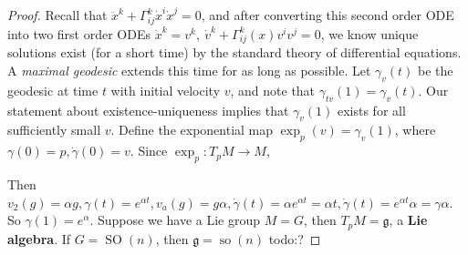 \begin{proof}
    Recall that $\ddot x^k+\Gamma _{ij}^k \dot x^i \dot x^j =0$, and after converting this second order ODE into two first order ODEs $\dot x^k=v^k,\ \dot v^k+\Gamma _{ij}^k(x)v^i v^j =0$, we know unique solutions exist (for a short time) by the standard theory of differential equations. A \emph{maximal geodesic} extends this time for as long as possible. Let $\gamma _v(t)$ be the geodesic at time $t$ with initial velocity $v$, and note that $\gamma _{tv}(1)=\gamma _v(t)$. Our statement about existence-uniqueness implies that $\gamma _v(1)$ exists for all sufficiently small $v$. Define the exponential map $\exp_p(v)=\gamma _v(1)$, where $\gamma (0)=p,\dot \gamma (0)=v$. Since $\exp _p \colon T_p M \to M$,

    Then $v_2(g)=\alpha g, \gamma (t)=e^{\alpha t}, v_a(g)=g\alpha ,\dot \gamma (t)=\alpha e^{\alpha t}=\alpha t,\dot \gamma (t)=e^{\alpha t}\alpha =\gamma \alpha $. So $\gamma (1)=e^{\alpha}$.
    Suppose we have a Lie group $M=G$, then $T_p M= \mathfrak g$, a \textbf{Lie algebra}. If $G= \operatorname{SO}(n)$, then $\mathfrak g=\operatorname{so}(n)$
    {\color{red}todo:?} 
\end{proof}
